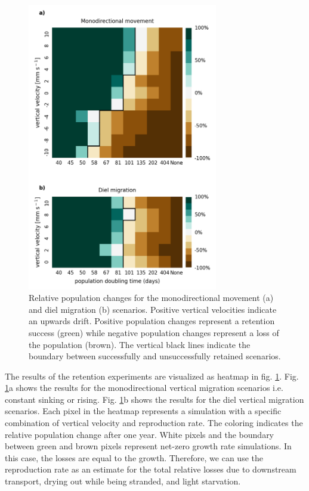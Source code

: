 \documentclass[npg, manuscript]{copernicus}
\begin{document}
\begin{figure}
    \includegraphics[width=8.3cm]{retention_success_combined.png}
    \caption[]{
        Relative population changes for the monodirectional movement (a) and diel migration (b) scenarios. Positive vertical velocities indicate an upwards drift. Positive population changes represent a retention success (green) while negative population changes represent a loss of the population (brown). 
        The vertical black lines indicate the boundary between successfully and unsuccessfully retained scenarios.
    }
    \label{fig:retention_success}
\end{figure}

The results of the retention experiments are visualized as heatmap in fig. \ref{fig:retention_success}.
Fig. \ref{fig:retention_success}a shows the results for the monodirectional vertical migration scenarios i.e. constant sinking or rising. 
Fig. \ref{fig:retention_success}b shows the results for the diel vertical migration scenarios. Each pixel in the heatmap represents a simulation with a specific combination of vertical velocity and reproduction rate. The coloring indicates the relative population change after one year. White pixels and the boundary between green and brown pixels represent net-zero growth rate simulations. In this case, the losses are equal to the growth. Therefore, we can use the reproduction rate as an estimate for the total relative losses due to downstream transport, drying out while being stranded, and light starvation.
\end{document}
